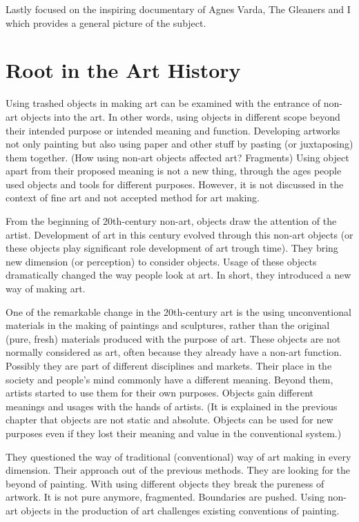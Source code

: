 Lastly focused on the inspiring documentary of Agnes Varda, The Gleaners and I which provides a general picture of the subject.





%
%
\section{Root in the Art History}
Using trashed objects in making art can be examined with the entrance of non-art objects into the art. In other words, using objects in different scope beyond their intended purpose or intended meaning and function. Developing artworks not only painting but also using paper and other stuff by pasting (or juxtaposing) them together. (How using non-art objects affected art? Fragments) Using object apart from their proposed meaning is not a new thing, through the ages people used objects and tools for different purposes. However, it is not discussed in the context of fine art and not accepted method for art making.

From the beginning of 20th-century non-art, objects draw the attention of the artist. Development of art in this century evolved through this non-art objects (or these objects play significant role development of art trough time). They bring new dimension (or perception) to consider objects. Usage of these objects dramatically changed the way people look at art. In short, they introduced a new way of making art.

One of the remarkable change in the 20th-century art is the using unconventional materials in the making of paintings and sculptures, rather than the original (pure, fresh) materials produced with the purpose of art. These objects are not normally considered as art, often because they already have a non-art function. Possibly they are part of different disciplines and markets. Their place in the society and people's mind commonly have a different meaning. Beyond them, artists started to use them for their own purposes. Objects gain different meanings and usages with the hands of artists. (It is explained in the previous chapter that objects are not static and absolute. Objects can be used for new purposes even if they lost their meaning and value in the conventional system.)

They questioned the way of traditional (conventional) way of art making in every dimension. Their approach out of the previous methods. They are looking for the beyond of painting. With using different objects they break the pureness of artwork. It is not pure anymore, fragmented. Boundaries are pushed. Using non-art objects in the production of art challenges existing conventions of painting. 

